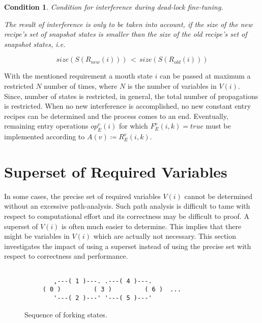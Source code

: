 \documentclass[12pt,a4paper]{scrartcl}
\newtheorem{condition}{Condition}
\begin{document}
\begin{condition}
Condition for interference during dead-lock fine-tuning.

The result of interference is only to be taken into account, if the size of the
new recipe's set of snapshot states is smaller than the size of the old
recipe's set of snapshot states, i.e.

\begin{equation} 
    size(S(R_{new}(i)))\,<\,size(S(R_{old}(i)))
\end{equation}

\end{condition}

With the mentioned requirement a mouth state $i$ can be passed at maximum a
restricted $N$ number of times, where $N$ is the number of variables in $V(i)$.
Since, number of states is restricted, in general, the total number of
propagations is restricted. When no new interference is accomplished, no new
constant entry recipes can be determined and the process comes to an end.
Eventually, remaining entry operations $op_E^v(i)$ for which $F_E^v(i,k)=true$
must be implemented according to $A(v) \coloneqq  R_E^v(i,k)$.

\section{Superset of Required Variables}

In some cases, the precise set of required variables $V(i)$ cannot be
determined without an excessive path-analysis. Such path analysis is difficult
to tame with respect to computational effort and its correctness may be
difficult to proof.  A superset of $V(i)$ is often much easier to determine.
This implies that there might be variables in $V(i)$ which are actually not
necessary. This section investigates the impact of using a superset instead
of using the precise set with respect to correctness and performance. 

\begin{figure}[htbp] \leavevmode \label{fig:fork-states}
\begin{verbatim}
         
        ,---( 1 )---. .---( 4 )---.       
     ( 0 )         ( 3 )         ( 6 )  ...
        '---( 2 )---' '---( 5 )---'

\end{verbatim}
\caption{Sequence of forking states.}
\end{figure}
\end{document}
